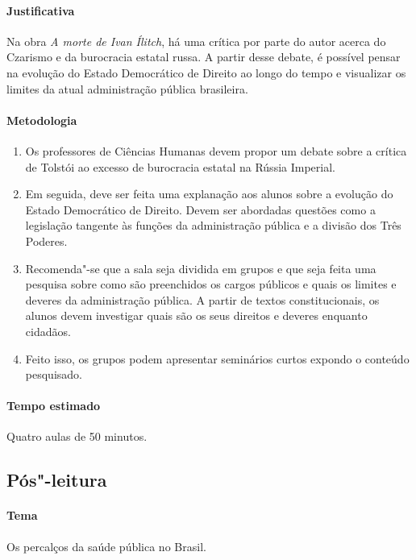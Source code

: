 \documentclass[12pt]{extarticle}
\begin{document}
\paragraph{Justificativa} Na obra \emph{A morte de Ivan Ílitch}, 
há uma crítica por parte do autor acerca do Czarismo e da burocracia estatal russa.
A partir desse debate, é possível pensar na evolução do Estado Democrático
de Direito ao longo do tempo e visualizar os limites da atual administração
pública brasileira.

\paragraph{Metodologia}

\begin{enumerate}

\item Os professores de Ciências Humanas devem propor um debate sobre
a crítica de Tolstói ao excesso de burocracia estatal na Rússia Imperial.

\item Em seguida, deve ser feita uma explanação aos alunos sobre a
evolução do Estado Democrático de Direito. Devem ser abordadas questões
como a legislação tangente às funções da administração
pública e a divisão dos Três Poderes.

\item Recomenda"-se que a sala seja dividida em grupos e que seja
feita uma pesquisa sobre como são preenchidos os cargos públicos
e quais os limites e deveres da administração pública.
A partir de textos constitucionais, os alunos devem investigar quais
são os seus direitos e deveres enquanto cidadãos.

\item Feito isso, os grupos podem apresentar seminários curtos expondo o
conteúdo pesquisado.

\end{enumerate}

\paragraph{Tempo estimado} Quatro aulas de 50 minutos.


\subsection{Pós"-leitura}

\paragraph{Tema} Os percalços da saúde pública no Brasil.
\end{document}
